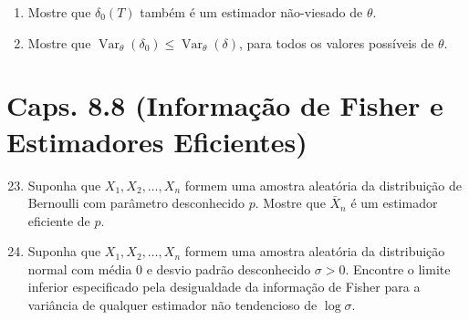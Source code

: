 \documentclass[leqno, 12pt]{article}
\theoremstyle{definition}
\newcommand{\vr}{\operatorname{Var}} %
\newcommand{\rs}{X_1, X_2, \ldots, X_n} %
\begin{document}
\begin{enumerate}
\begin{enumerate}
    \item Mostre que $\delta_0(T)$ também é um estimador não-viesado de $\theta$.

    \item Mostre que $\vr_\theta(\delta_0) \le \vr_\theta(\delta)$, para todos os valores possíveis de $\theta$.
\end{enumerate}

\end{enumerate}

\section*{Caps. 8.8 (Informação de Fisher e Estimadores Eficientes)}

\begin{enumerate}
\setcounter{enumi}{22}


\item \textbf{\parencite[ex. 7, pág. 527]{DeGroot:2014}}
Suponha que \(\rs\) formem uma amostra aleatória da distribuição de Bernoulli com parâmetro desconhecido \(p\). Mostre que \(\bar X_n\) é um estimador eficiente de \(p\).


\item \textbf{\parencite[ex. 10, pág. 527]{DeGroot:2014}}
Suponha que \(\rs\) formem uma amostra aleatória da distribuição normal com média 0 e desvio padrão desconhecido \(\sigma > 0\). Encontre o limite inferior especificado pela desigualdade da informação de Fisher para a variância de qualquer estimador não tendencioso de \(\log \sigma\).


\end{enumerate}

\nocite{*}
\newpage
\printbibliography
\end{document}
